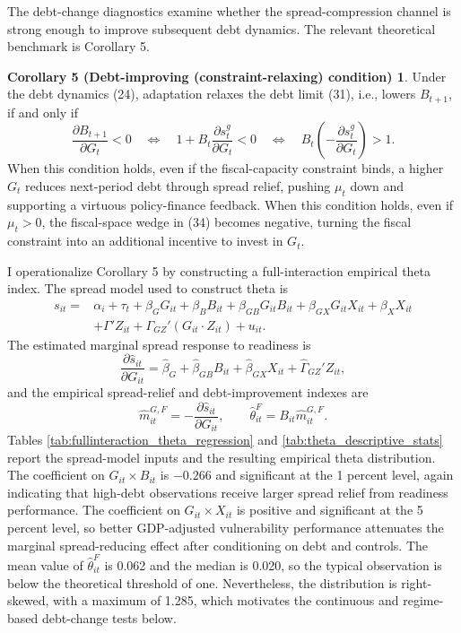 \documentclass[11pt]{article}
\theoremstyle{definition}
\newtheorem*{corFive}{Corollary 5 (Debt-improving (constraint-relaxing) condition)}
\begin{document}
The debt-change diagnostics examine whether the spread-compression channel is strong enough to improve subsequent debt dynamics. The relevant theoretical benchmark is Corollary 5.

\begin{corFive}
Under the debt dynamics (24), adaptation relaxes the debt limit (31), i.e., lowers $B_{t+1}$, if and only if
\begin{equation}
\frac{\partial B_{t+1}}{\partial G_t}<0
\quad\Longleftrightarrow\quad
1+B_t\frac{\partial s^g_t}{\partial G_t}<0
\quad\Longleftrightarrow\quad
B_t\left(-\frac{\partial s^g_t}{\partial G_t}\right)>1.
\end{equation}
When this condition holds, even if the fiscal-capacity constraint binds, a higher $G_t$ reduces next-period debt through spread relief, pushing $\mu_t$ down and supporting a virtuous policy-finance feedback. When this condition holds, even if $\mu_t>0$, the fiscal-space wedge in (34) becomes negative, turning the fiscal constraint into an additional incentive to invest in $G_t$.
\end{corFive}

I operationalize Corollary 5 by constructing a full-interaction empirical theta index. The spread model used to construct theta is
\begin{equation}
\begin{split}
    s_{it}=&\alpha_i+\tau_t+\beta_GG_{it}+\beta_BB_{it}+\beta_{GB}G_{it}B_{it}+\beta_{GX}G_{it}X_{it}+\beta_XX_{it} \\
    &+\Gamma'Z_{it}+\Gamma_{GZ}'(G_{it}\cdot Z_{it})+u_{it}.
\end{split}
\end{equation}
The estimated marginal spread response to readiness is
\begin{equation}
    \frac{\partial \widehat{s}_{it}}{\partial G_{it}}
    =\widehat{\beta}_G+\widehat{\beta}_{GB}B_{it}+\widehat{\beta}_{GX}X_{it}+\widehat{\Gamma}_{GZ}'Z_{it},
\end{equation}
and the empirical spread-relief and debt-improvement indexes are
\begin{equation}
    \widehat{m}^{G,F}_{it}=-\frac{\partial \widehat{s}_{it}}{\partial G_{it}},
    \qquad
    \widehat{\theta}^F_{it}=B_{it}\widehat{m}^{G,F}_{it}.
\end{equation}
Tables \ref{tab:fullinteraction_theta_regression} and \ref{tab:theta_descriptive_stats} report the spread-model inputs and the resulting empirical theta distribution. The coefficient on $G_{it}\times B_{it}$ is $-0.266$ and significant at the 1 percent level, again indicating that high-debt observations receive larger spread relief from readiness performance. The coefficient on $G_{it}\times X_{it}$ is positive and significant at the 5 percent level, so better GDP-adjusted vulnerability performance attenuates the marginal spread-reducing effect after conditioning on debt and controls. The mean value of $\widehat{\theta}^F_{it}$ is 0.062 and the median is 0.020, so the typical observation is below the theoretical threshold of one. Nevertheless, the distribution is right-skewed, with a maximum of 1.285, which motivates the continuous and regime-based debt-change tests below.
\end{document}

